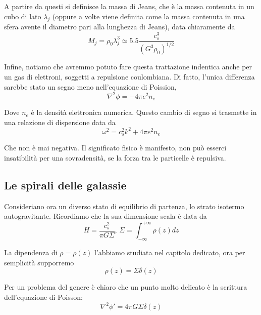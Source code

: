 \documentclass{report}
\begin{document}
A partire da questi si definisce la massa di Jeans, che è la massa contenuta in un cubo di lato $\lambda_j$ (oppure a volte viene definita come la massa contenuta in una sfera avente il diametro pari alla lunghezza di Jeans), data chiaramente da 
\begin{equation}
    M_j = \rho_0\lambda_j^3 \simeq 5.5 \frac{c_s^3}{(G^3\rho_0)^{1/2}}
\end{equation}

Infine, notiamo che avremmo potuto fare questa trattazione indentica anche per un gas di elettroni, soggetti a repulsione coulombiana. Di fatto, l'unica differenza sarebbe stato un segno meno nell'equazione di Poission, 
\begin{equation}
    \nabla^2\phi = -4\pi e^2 n_e
\end{equation}

Dove $n_e$ è la densità elettronica numerica. Questo cambio di segno si trasmette in una relazione di dispersione data da 
\begin{equation}
    \omega^2 = c_s^2k^2 + 4\pi e^2n_e
\end{equation}

Che non è mai negativa. Il significato fisico è manifesto, non può esserci insatibilità per una sovradensità, se la forza tra le particelle è repulsiva. 

\subsection{Le spirali delle galassie}

Consideriano ora un diverso stato di equilibrio di partenza, lo strato isotermo autogravitante. Ricordiamo che la sua dimensione scala è data da 
\begin{equation}
    H = \frac{c_s^2}{\pi G \Sigma}, \, \Sigma = \int_{-\infty}^{+\infty}\rho(z)dz
\end{equation}

La dipendenza di $\rho = \rho(z)$ l'abbiamo studiata nel capitolo dedicato, ora per semplicità supporremo 
\begin{equation}
    \rho(z) = \Sigma \delta(z)
\end{equation}

Per un problema del genere è chiaro che un punto molto delicato è la scrittura dell'equazione di Poisson: 
\begin{equation}
    \nabla^2 \phi' = 4\pi G \Sigma \delta(z)
\end{equation}
\end{document}
